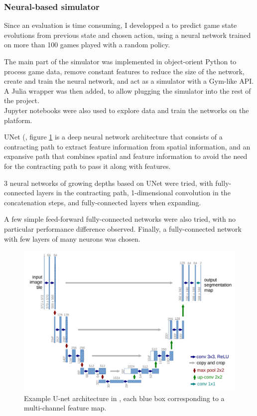 \subsubsection{Neural-based simulator}
Since an evaluation is time consuming, I developped a  to predict game state evolutions from previous state and chosen action, using a neural network trained on more than 100 games played with a random policy.

The  main part of the simulator was implemented in object-orient Python to process game data, remove constant features to reduce the size of the network, create and train the neural network, and act as a simulator with a Gym-like API. A Julia wrapper was then added, to allow plugging the simulator into the rest of the project.\\
Jupyter notebooks were also used to explore data and train the networks on the  platform.  


UNet (\cite{unet}, figure \ref{fig:unet} is a deep neural network architecture that consists of a contracting path to extract feature information from spatial information, and an expansive path that combines spatial and feature information to avoid the need for the contracting path to pass it along with features.

3 neural networks of growing depths based on UNet were tried, with fully-connected layers in the contracting path, 1-dimensional convolution in the concatenation steps, and fully-connected layers when expanding. 

A few simple feed-forward fully-connected networks were also tried, with no particular performance difference observed. Finally, a fully-connected network with few layers of many neurons was chosen.

\begin{figure}[H]
 \centering
 \captionsetup{justification=centering, margin=0.5cm}
 \includegraphics[width=14cm]{images/unet.PNG}
\caption{Example U-net architecture in \cite{unet}, each blue box corresponding to a multi-channel feature map.}
 \label{fig:unet}
\end{figure}

